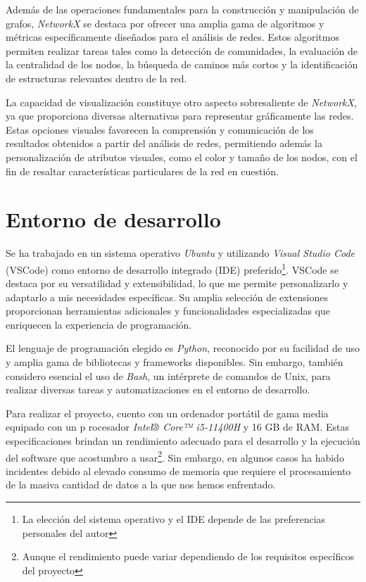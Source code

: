 Además de las operaciones fundamentales para la construcción y manipulación de grafos, \emph{NetworkX} se
destaca por ofrecer una amplia gama de algoritmos y métricas específicamente diseñados para el análisis de redes. 
Estos algoritmos permiten realizar tareas tales como la detección de comunidades, la evaluación de la centralidad de 
los nodos, la búsqueda de caminos más cortos y la identificación de estructuras relevantes dentro de la red.

La capacidad de visualización constituye otro aspecto sobresaliente de \emph{NetworkX}, ya que proporciona 
diversas alternativas para representar gráficamente las redes. Estas opciones visuales favorecen la comprensión 
y comunicación de los resultados obtenidos a partir del análisis de redes, permitiendo además la personalización 
de atributos visuales, como el color y tamaño de los nodos, con el fin de resaltar características particulares 
de la red en cuestión.

\section{Entorno de desarrollo}

Se ha trabajado en un sistema operativo \textit{Ubuntu} y utilizando \textit{Visual Studio Code} 
(VSCode) como entorno de desarrollo integrado (IDE) preferido\footnote{ La elección del sistema 
operativo y el IDE depende de las preferencias personales del autor}. VSCode se destaca por 
su versatilidad y extensibilidad, lo que me permite personalizarlo y adaptarlo a mis necesidades 
específicas. Su amplia selección de extensiones proporcionan herramientas adicionales y funcionalidades 
especializadas que enriquecen la experiencia de programación.

El lenguaje de programación elegido es \textit{Python}, reconocido por su facilidad de uso y amplia 
gama de bibliotecas y frameworks disponibles. Sin embargo, también considero esencial el uso de \textit{Bash}, 
un intérprete de comandos de Unix, para realizar diversas tareas y automatizaciones en el entorno 
de desarrollo.

Para realizar el proyecto, cuento con un ordenador portátil de gama media equipado con un p
rocesador \textit{Intel® Core™ i5-11400H} y 16 GB de RAM. Estas especificaciones brindan un rendimiento 
adecuado para el desarrollo y la ejecución del software que acostumbro a usar\footnote{ Aunque el 
rendimiento puede variar dependiendo de los requisitos específicos del proyecto}. Sin embargo, en 
algunos casos ha habido incidentes debido al elevado consumo de memoria que requiere el procesamiento 
de la masiva cantidad de datos a la que nos hemos enfrentado.

